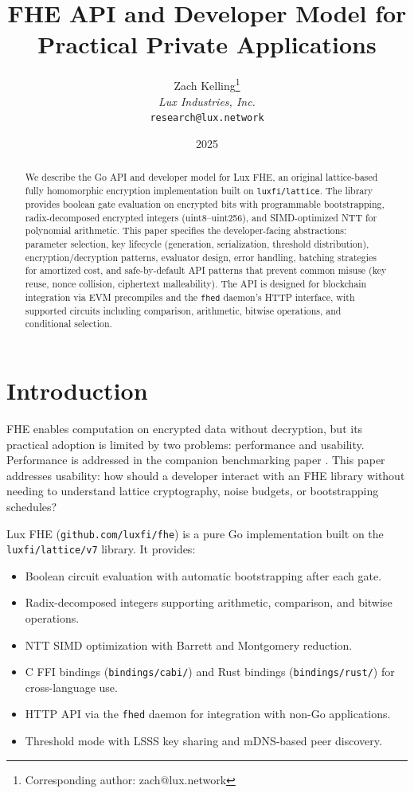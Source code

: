 \documentclass[11pt]{article}
\title{FHE API and Developer Model for Practical Private Applications}
\author{
Zach Kelling\thanks{Corresponding author: zach@lux.network}\\
\textit{Lux Industries, Inc.}\\
\texttt{research@lux.network}
}
\date{2025}
\begin{document}
\luxcoverpage

\begin{abstract}
We describe the Go API and developer model for Lux FHE, an original lattice-based fully homomorphic encryption implementation built on \texttt{luxfi/lattice}. The library provides boolean gate evaluation on encrypted bits with programmable bootstrapping, radix-decomposed encrypted integers (uint8--uint256), and SIMD-optimized NTT for polynomial arithmetic. This paper specifies the developer-facing abstractions: parameter selection, key lifecycle (generation, serialization, threshold distribution), encryption/decryption patterns, evaluator design, error handling, batching strategies for amortized cost, and safe-by-default API patterns that prevent common misuse (key reuse, nonce collision, ciphertext malleability). The API is designed for blockchain integration via EVM precompiles and the \texttt{fhed} daemon's HTTP interface, with supported circuits including comparison, arithmetic, bitwise operations, and conditional selection.
\end{abstract}

\section{Introduction}

FHE enables computation on encrypted data without decryption, but its practical adoption is limited by two problems: performance and usability. Performance is addressed in the companion benchmarking paper \cite{fhe-benchmarks}. This paper addresses usability: how should a developer interact with an FHE library without needing to understand lattice cryptography, noise budgets, or bootstrapping schedules?

Lux FHE (\texttt{github.com/luxfi/fhe}) is a pure Go implementation built on the \texttt{luxfi/lattice/v7} library. It provides:
\begin{itemize}
\item Boolean circuit evaluation with automatic bootstrapping after each gate.
\item Radix-decomposed integers supporting arithmetic, comparison, and bitwise operations.
\item NTT SIMD optimization with Barrett and Montgomery reduction.
\item C FFI bindings (\texttt{bindings/cabi/}) and Rust bindings (\texttt{bindings/rust/}) for cross-language use.
\item HTTP API via the \texttt{fhed} daemon for integration with non-Go applications.
\item Threshold mode with LSSS key sharing and mDNS-based peer discovery.
\end{itemize}
\end{document}
